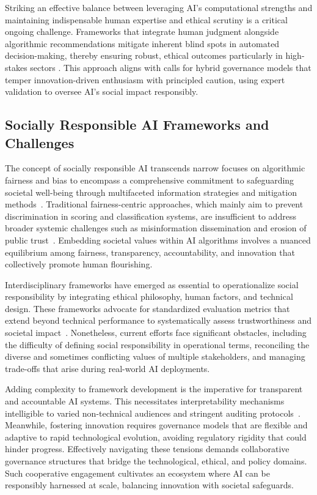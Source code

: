 \documentclass[sigconf]{acmart}
\begin{document}
Striking an effective balance between leveraging AI’s computational strengths and maintaining indispensable human expertise and ethical scrutiny is a critical ongoing challenge. Frameworks that integrate human judgment alongside algorithmic recommendations mitigate inherent blind spots in automated decision-making, thereby ensuring robust, ethical outcomes particularly in high-stakes sectors \cite{ref2}. This approach aligns with calls for hybrid governance models that temper innovation-driven enthusiasm with principled caution, using expert validation to oversee AI’s social impact responsibly.

\subsection{Socially Responsible AI Frameworks and Challenges}

The concept of socially responsible AI transcends narrow focuses on algorithmic fairness and bias to encompass a comprehensive commitment to safeguarding societal well-being through multifaceted information strategies and mitigation methods~\cite{ref26}. Traditional fairness-centric approaches, which mainly aim to prevent discrimination in scoring and classification systems, are insufficient to address broader systemic challenges such as misinformation dissemination and erosion of public trust~\cite{ref36}. Embedding societal values within AI algorithms involves a nuanced equilibrium among fairness, transparency, accountability, and innovation that collectively promote human flourishing.

Interdisciplinary frameworks have emerged as essential to operationalize social responsibility by integrating ethical philosophy, human factors, and technical design. These frameworks advocate for standardized evaluation metrics that extend beyond technical performance to systematically assess trustworthiness and societal impact~\cite{ref26}. Nonetheless, current efforts face significant obstacles, including the difficulty of defining social responsibility in operational terms, reconciling the diverse and sometimes conflicting values of multiple stakeholders, and managing trade-offs that arise during real-world AI deployments.

Adding complexity to framework development is the imperative for transparent and accountable AI systems. This necessitates interpretability mechanisms intelligible to varied non-technical audiences and stringent auditing protocols~\cite{ref36}. Meanwhile, fostering innovation requires governance models that are flexible and adaptive to rapid technological evolution, avoiding regulatory rigidity that could hinder progress. Effectively navigating these tensions demands collaborative governance structures that bridge the technological, ethical, and policy domains. Such cooperative engagement cultivates an ecosystem where AI can be responsibly harnessed at scale, balancing innovation with societal safeguards.
\end{document}
